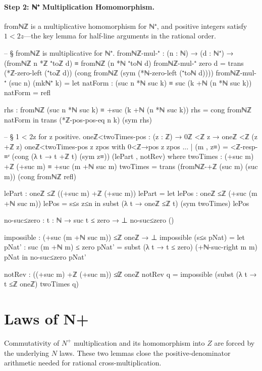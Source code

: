 \documentclass[11pt,a4paper]{book}
\def\mathbb#1{#1}%
\def\texttt#1{#1}%
\def\texorpdfstring#1#2{#2}%
\begin{document}
\paragraph{Step 2: ℕ⁺ Multiplication Homomorphism.}
\texttt{fromℕℤ} is a multiplicative homomorphism for ℕ⁺,
and positive integers satisfy $1 < 2z$---the key lemma for
half-line arguments in the rational order.

\begin{code}
-- § fromℕℤ is multiplicative for ℕ⁺.
fromℕℤ-mul-⁺ : (n : ℕ) → (d : ℕ⁺) → (fromℕℤ n *ℤ ⁺toℤ d) ≡ fromℕℤ (n *ℕ ⁺toℕ d)
fromℕℤ-mul-⁺ zero d =
  trans
    (*ℤ-zero-left (⁺toℤ d))
    (cong fromℕℤ (sym (*ℕ-zero-left (⁺toℕ d))))
fromℕℤ-mul-⁺ (suc n) (mkℕ⁺ k) =
  let
    natForm : (suc n *ℕ suc k) ≡ suc (k +ℕ (n *ℕ suc k))
    natForm = refl

    rhs : fromℕℤ (suc n *ℕ suc k) ≡ +suc (k +ℕ (n *ℕ suc k))
    rhs = cong fromℕℤ natForm
  in
  trans
    (*ℤ-pos-pos-eq n k)
    (sym rhs)

-- § 1 < 2z for z positive.
oneℤ<twoTimes-pos : (z : ℤ) → 0ℤ <ℤ z → oneℤ <ℤ (z +ℤ z)
oneℤ<twoTimes-pos z zpos with 0<ℤ→pos z zpos
... | (m , z≡) =
  <ℤ-resp-≡ʳ (cong (λ t → t +ℤ t) (sym z≡)) (lePart , notRev)
  where
    twoTimes : (+suc m) +ℤ (+suc m) ≡ +suc (m +ℕ suc m)
    twoTimes =
      trans
        (fromℕℤ-+ℤ (suc m) (suc m))
        (cong fromℕℤ refl)

    lePart : oneℤ ≤ℤ ((+suc m) +ℤ (+suc m))
    lePart =
      let
        lePos : oneℤ ≤ℤ (+suc (m +ℕ suc m))
        lePos = s≤s z≤n
      in
        subst (λ t → oneℤ ≤ℤ t) (sym twoTimes) lePos

    no-suc≤zero : {t : ℕ} → suc t ≤ zero → ⊥
    no-suc≤zero ()

    impossible : (+suc (m +ℕ suc m)) ≤ℤ oneℤ → ⊥
    impossible (s≤s pNat) =
      let
        pNat' : suc (m +ℕ m) ≤ zero
        pNat' = subst (λ t → t ≤ zero) (+ℕ-suc-right m m) pNat
      in
      no-suc≤zero pNat'

    notRev : ((+suc m) +ℤ (+suc m)) ≰ℤ oneℤ
    notRev q = impossible (subst (λ t → t ≤ℤ oneℤ) twoTimes q)
\end{code}

\section{Laws of \texorpdfstring{$\mathbb{N}^+$}{N+}}

Commutativity of $\mathbb{N}^+$ multiplication and its homomorphism into $\mathbb{Z}$ are forced by the underlying $\mathbb{N}$ laws.
These two lemmas close the positive-denominator arithmetic needed for rational cross-multiplication.
\end{document}
